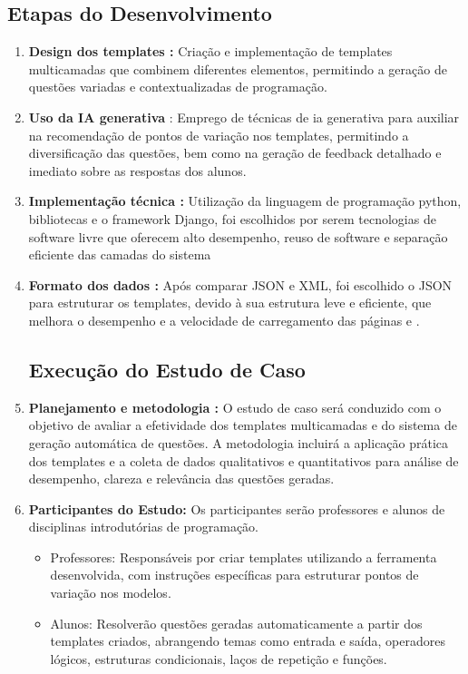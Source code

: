 \subsection{\textbf{Etapas do Desenvolvimento}}

\begin{enumerate}[label=\textbf{\alph*)}]
    \item \textbf{Design dos templates :}  Criação e implementação de templates multicamadas que combinem diferentes elementos, permitindo a geração de questões variadas e contextualizadas de programação. 
    \item \textbf{Uso da IA generativa} : Emprego de técnicas de \gls{ia} generativa para auxiliar na recomendação de pontos de variação nos templates, permitindo a diversificação das questões, bem como na geração de feedback detalhado e imediato sobre as respostas dos alunos. 
    \item \textbf{Implementação técnica :}  Utilização da linguagem de programação python, bibliotecas e o framework Django, foi escolhidos por serem tecnologias de software livre que oferecem alto desempenho, reuso de software e separação eficiente das camadas do sistema  \parencite{rubio2017}
    \item \textbf{Formato dos dados :}  Após comparar JSON e XML, foi escolhido o JSON para estruturar os templates, devido à sua estrutura leve e eficiente, que melhora o desempenho e a velocidade de carregamento das páginas \parencite{goyal2017} e \parencite{wang2011} .

    \subsection{\textbf{Execução do Estudo de Caso}}


    \item \textbf{Planejamento e metodologia :}  O estudo de caso será conduzido com o objetivo de avaliar a efetividade dos templates multicamadas e do sistema de geração automática de questões. A metodologia incluirá a aplicação prática dos templates e a coleta de dados qualitativos e quantitativos para análise de desempenho, clareza e relevância das questões geradas. 

    \item \textbf{Participantes do Estudo:}  Os participantes serão professores e alunos de disciplinas introdutórias de programação.

\begin{itemize}
    \item Professores: Responsáveis por criar templates utilizando a ferramenta desenvolvida, com instruções específicas para estruturar pontos de variação nos modelos.
    \item Alunos: Resolverão questões geradas automaticamente a partir dos templates criados, abrangendo temas como entrada e saída, operadores lógicos, estruturas condicionais, laços de repetição e funções.
\end{itemize}
 

\end{enumerate}
